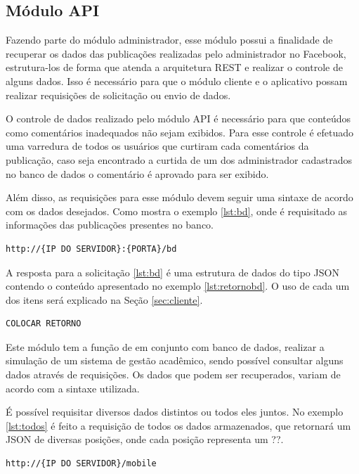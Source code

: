 \subsection{Módulo API}
Fazendo parte do módulo administrador, esse módulo possui a finalidade de recuperar os dados das publicações realizadas pelo administrador no Facebook, estrutura-los de forma que atenda a arquitetura REST e realizar o controle de alguns dados. Isso é necessário para que o módulo cliente e o aplicativo possam realizar requisições de solicitação ou envio de dados.

O controle de dados realizado pelo módulo API é necessário para que conteúdos como comentários inadequados não sejam exibidos. Para esse controle é efetuado uma varredura de todos os usuários que curtiram cada comentários da publicação, caso seja encontrado a curtida de um dos administrador cadastrados no banco de dados o comentário é aprovado para ser exibido.

Além disso, as requisições para esse módulo devem seguir uma sintaxe de acordo com os dados desejados. Como mostra o exemplo \ref{lst:bd}, onde é requisitado as informações das publicações presentes no banco.

\begin{lstlisting}[caption={Requisitando dados para divulgação},label={lst:bd}]
	http://{IP DO SERVIDOR}:{PORTA}/bd
\end{lstlisting}

A resposta para a solicitação \ref{lst:bd} é uma estrutura de dados do tipo JSON contendo o conteúdo apresentado no exemplo \ref{lst:retornobd}. O uso de cada um dos itens será explicado na Seção \ref{sec:cliente}.

\begin{lstlisting}[caption={Retorno da requisição \ref{lst:bd}},label={lst:retornobd}]
	COLOCAR RETORNO
\end{lstlisting}

Este módulo tem a função de em conjunto com banco de dados, realizar a simulação de um sistema de gestão acadêmico, sendo possível consultar alguns dados através de requisições. Os dados que podem ser recuperados, variam de acordo com a sintaxe utilizada.

É possível requisitar diversos dados distintos ou todos eles juntos. 
No exemplo \ref{lst:todos} é feito a requisição de todos os dados armazenados, que retornará um JSON de diversas posições, onde cada posição representa um ??.
\begin{lstlisting}[caption={Requisitar todos os dados},label={lst:todos}]
	http://{IP DO SERVIDOR}/mobile
\end{lstlisting}

